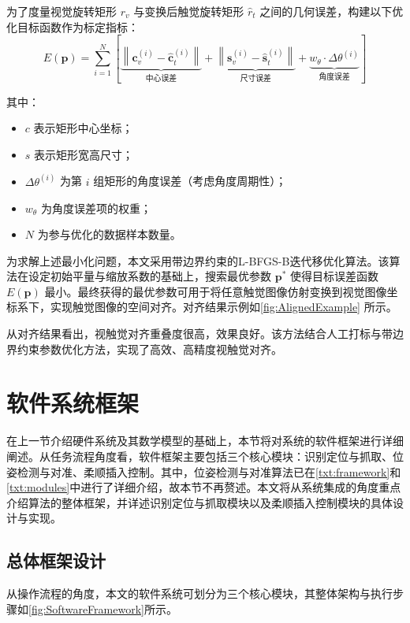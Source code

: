 \documentclass{Diploma}
\begin{document}
为了度量视觉旋转矩形 $r_v$ 与变换后触觉旋转矩形 $\hat{r}_t$ 之间的几何误差，构建以下优化目标函数作为标定指标：
\begin{equation}
E(\boldsymbol{p}) = \sum_{i=1}^{N} 
\left[ 
\underbrace{\left\| \boldsymbol{c}_v^{(i)} - \hat{\boldsymbol{c}}_t^{(i)} \right\|}_{\text{中心误差}} 
+ \underbrace{\left\| \boldsymbol{s}_v^{(i)} - \hat{\boldsymbol{s}}_t^{(i)} \right\|}_{\text{尺寸误差}} 
+ \underbrace{w_{\theta} \cdot \Delta \theta^{(i)}}_{\text{角度误差}} 
\right]
\label{eq:alignment_loss}
\end{equation}

其中：
\begin{itemize}
  \item $c$ 表示矩形中心坐标；
  \item $s$ 表示矩形宽高尺寸；
  \item $\Delta \theta^{(i)}$ 为第 $i$ 组矩形的角度误差（考虑角度周期性）；
  \item $w_\theta$ 为角度误差项的权重；
  \item $N$ 为参与优化的数据样本数量。
\end{itemize}

为求解上述最小化问题，本文采用带边界约束的L-BFGS-B\cite{zhu1997algorithm}迭代移优化算法。该算法在设定初始平量与缩放系数的基础上，搜索最优参数 $\boldsymbol{p}^*$ 使得目标误差函数 $E(\boldsymbol{p})$ 最小。最终获得的最优参数可用于将任意触觉图像仿射变换到视觉图像坐标系下，实现触觉图像的空间对齐。对齐结果示例如\ref{fig:AlignedExample} 所示。

%

从对齐结果看出，视触觉对齐重叠度很高，效果良好。该方法结合人工打标与带边界约束参数优化方法，实现了高效、高精度视触觉对齐。

\section{软件系统框架}
在上一节介绍硬件系统及其数学模型的基础上，本节将对系统的软件框架进行详细阐述。从任务流程角度看，软件框架主要包括三个核心模块：识别定位与抓取、位姿检测与对准、柔顺插入控制。其中，位姿检测与对准算法已在\ref{txt:framework}和\ref{txt:modules}中进行了详细介绍，故本节不再赘述。本文将从系统集成的角度重点介绍算法的整体框架，并详述识别定位与抓取模块以及柔顺插入控制模块的具体设计与实现。
\subsection{总体框架设计}
从操作流程的角度，本文的软件系统可划分为三个核心模块，其整体架构与执行步骤如\ref{fig:SoftwareFramework}所示。
\end{document}
